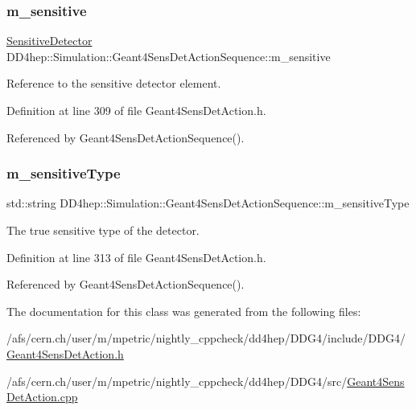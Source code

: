 \subsubsection{\texorpdfstring{m\+\_\+sensitive}{m\_sensitive}}
{\footnotesize\ttfamily \hyperlink{class_d_d4hep_1_1_simulation_1_1_geant4_sens_det_action_sequence_a9d428afdc7b9189bce5dab4f16db17fb}{Sensitive\+Detector} D\+D4hep\+::\+Simulation\+::\+Geant4\+Sens\+Det\+Action\+Sequence\+::m\+\_\+sensitive\hspace{0.3cm}{\ttfamily [protected]}}



Reference to the sensitive detector element. 



Definition at line 309 of file Geant4\+Sens\+Det\+Action.\+h.



Referenced by Geant4\+Sens\+Det\+Action\+Sequence().

\hypertarget{class_d_d4hep_1_1_simulation_1_1_geant4_sens_det_action_sequence_a51bf2c5186ea7905ae655b44d6aea06f}{}\label{class_d_d4hep_1_1_simulation_1_1_geant4_sens_det_action_sequence_a51bf2c5186ea7905ae655b44d6aea06f} 
\subsubsection{\texorpdfstring{m\+\_\+sensitive\+Type}{m\_sensitiveType}}
{\footnotesize\ttfamily std\+::string D\+D4hep\+::\+Simulation\+::\+Geant4\+Sens\+Det\+Action\+Sequence\+::m\+\_\+sensitive\+Type\hspace{0.3cm}{\ttfamily [protected]}}



The true sensitive type of the detector. 



Definition at line 313 of file Geant4\+Sens\+Det\+Action.\+h.



Referenced by Geant4\+Sens\+Det\+Action\+Sequence().



The documentation for this class was generated from the following files\+:\begin{DoxyCompactItemize}
\item 
/afs/cern.\+ch/user/m/mpetric/nightly\+\_\+cppcheck/dd4hep/\+D\+D\+G4/include/\+D\+D\+G4/\hyperlink{_geant4_sens_det_action_8h}{Geant4\+Sens\+Det\+Action.\+h}\item 
/afs/cern.\+ch/user/m/mpetric/nightly\+\_\+cppcheck/dd4hep/\+D\+D\+G4/src/\hyperlink{_geant4_sens_det_action_8cpp}{Geant4\+Sens\+Det\+Action.\+cpp}\end{DoxyCompactItemize}
